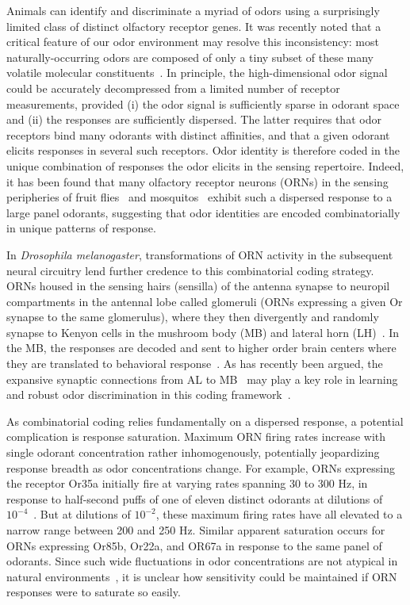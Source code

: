 
Animals can identify and discriminate a myriad of odors using a surprisingly limited class of distinct olfactory receptor genes. It was recently noted that a critical feature of our odor environment may resolve this inconsistency: most naturally-occurring odors are composed of only a tiny subset of these many volatile molecular constituents~\cite{vijay_1}. In principle, the high-dimensional odor signal could be accurately decompressed from a limited number of receptor measurements, provided (i) the odor signal is sufficiently sparse in odorant space and (ii) the responses are sufficiently dispersed. The latter requires that odor receptors bind many odorants with distinct affinities, and that a given odorant elicits responses in several such receptors. Odor identity is therefore coded in the unique combination of responses the odor elicits in the sensing repertoire. Indeed, it has been found that many olfactory receptor neurons (ORNs) in the sensing peripheries of fruit flies~\cite{hallem_carlson} and mosquitos~\cite{mosquito_combinatorial_coding} exhibit such a dispersed response to a large panel odorants, suggesting that odor identities are encoded combinatorially in unique patterns of response.

In \textit{Drosophila melanogaster}, transformations of ORN activity in the subsequent neural circuitry lend further credence to this combinatorial coding strategy. ORNs housed in the sensing hairs (sensilla) of the antenna synapse to neuropil compartments in the antennal lobe called glomeruli (ORNs expressing a given Or synapse to the same glomerulus), where they then divergently and randomly synapse to Kenyon cells in the mushroom body (MB) and lateral horn (LH)~\cite{early_olfactory_processing, abbott_axel}. In the MB, the responses are decoded and sent to higher order brain centers where they are translated to behavioral response~\cite{olfactory_map_chiang, mushroom_body_review}. As has recently been argued, the expansive synaptic connections from AL to MB~\cite{abbott_axel}  may play a key role in learning and robust odor discrimination in this coding framework~\cite{vijay_1}.

As combinatorial coding relies fundamentally on a dispersed response, a potential complication is response saturation. Maximum ORN firing rates increase with single odorant concentration rather inhomogenously, potentially jeopardizing response breadth as odor concentrations change. For example, ORNs expressing the receptor Or35a initially fire at varying rates spanning 30 to 300 Hz, in response to half-second puffs of one of eleven distinct odorants at dilutions of $10^{-4}$~\cite{hallem_carlson}. But at dilutions of $10^{-2}$, these maximum firing rates have all elevated to a narrow range between 200 and 250 Hz. Similar apparent saturation occurs for ORNs expressing Or85b, Or22a, and OR67a in response to the same panel of odorants. Since such wide fluctuations in odor concentrations are not atypical in natural environments~\cite{celani}, it is unclear how sensitivity could be maintained if ORN responses were to saturate so easily. 

